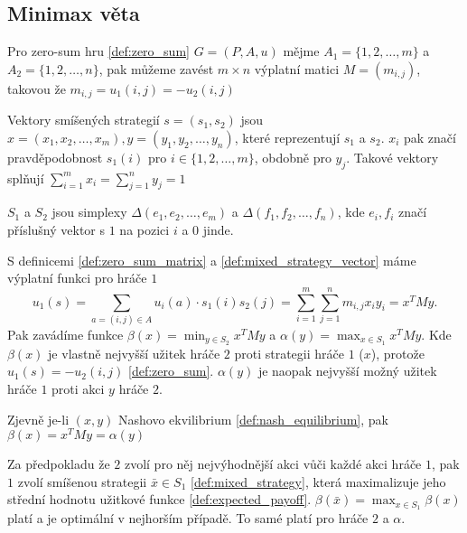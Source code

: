 \subsection{Minimax věta}
\begin{definition}
\label{def:zero_sum_matrix}
Pro zero-sum hru \ref{def:zero_sum} $G = (P, A, u)$ mějme $A_1 = \{1,2,\dots,m\}$ a $A_2 = \{1,2,\dots,n\}$, pak můžeme zavést $m \times n$ výplatní matici $M = (m_{i,j})$, takovou že $m_{i,j} = u_1(i,j) = -u_2(i,j)$
\end{definition}
\begin{definition}
\label{def:mixed_strategy_vector}
Vektory smíšených strategií $s =(s_1, s_2)$ jsou $x = (x_1, x_2, \dots, x_m), y = (y_1, y_2, \dots, y_n)$, které reprezentují $s_1$ a $s_2$. 
$x_i$ pak značí pravděpodobnost $s_1(i)$ pro $i \in \{1,2,\dots,m\}$, obdobně pro $y_j$. 
Takové vektory splňují $\sum_{i=1}^m  x_i = \sum_{j=1}^n  y_j = 1$

$S_1$ a $S_2$ jsou simplexy $\Delta(e_1, e_2, \dots, e_m)$ a $\Delta(f_1, f_2, \dots, f_n)$, kde $e_i, f_i$ značí příslušný vektor s $1$ na pozici $i$ a $0$ jinde.
\end{definition}
\begin{definition}
\label{def:beta_alpha}
S definicemi \ref{def:zero_sum_matrix} a \ref{def:mixed_strategy_vector} máme výplatní funkci pro hráče $1$
\[
    u_1(s) = \sum_{a = (i,j) \in A} u_i(a) \cdot s_1(i)s_2(j) = \sum^m_{i = 1} \sum^n_{j=1} m_{i,j} x_i y_i = x^T M y.
\]
Pak zavádíme funkce $\beta(x) = \min_{y \in S_2} x^T M y$ a $\alpha(y) = \max_{x\in S_1} x^T M y$. 
Kde $\beta(x)$ je vlastně nejvyšší užitek hráče $2$ proti strategii hráče $1$ ($x$), protože $u_1(s) = -u_2(i,j)$ \ref{def:zero_sum}. 
$\alpha(y)$ je naopak nejvyšší možný užitek hráče $1$ proti akci $y$ hráče $2$. 

Zjevně je-li $(x,y)$ Nashovo ekvilibrium \ref{def:nash_equilibrium}, pak $\beta(x) = x^T M y = \alpha(y)$
\end{definition}

Za předpokladu že $2$ zvolí pro něj nejvýhodnější akci vůči každé akci hráče $1$, pak $1$ zvolí smíšenou strategii $\bar{x} \in S_1$ \ref{def:mixed_strategy}, která maximalizuje jeho střední hodnotu užitkové funkce \ref{def:expected_payoff}. $\beta(\bar{x}) = \max_{x\in S_1} \beta(x)$ platí a je optimální v nejhorším případě. To samé platí pro hráče $2$ a $\alpha$. 

